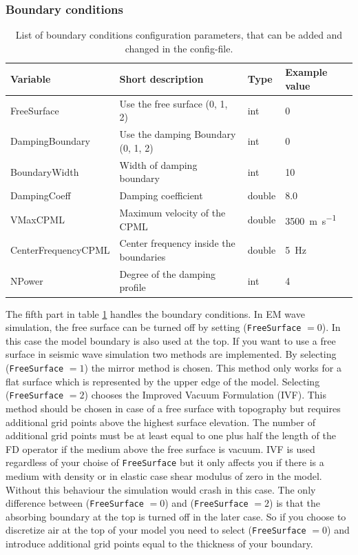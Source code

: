 \documentclass[pdftex,a4paper,parskip,listof=totoc,bibliography=totoc,onehalfspacing,12pt]{scrreprt}
\begin{document}
\subsubsection{Boundary conditions}
\begin{table}[h!]
\caption[List of boundary conditions configuration parameters.]{List of boundary conditions configuration parameters, that can be added and changed in the config-file.}\label{tab:config_boundary}
\centering
\begin{adjustbox}{width=1\textwidth,center=\textwidth}
	\begin{tabular}{llll}
	\toprule
	Variable & Short description & Type & Example value \\
	\midrule
	FreeSurface& Use the free surface (0, 1, 2) & int & \num{0}\\
	DampingBoundary& Use the damping Boundary (0, 1, 2) & int & \num{0}\\
	BoundaryWidth& Width of damping boundary & int & \num{10}\\
	DampingCoeff& Damping coefficient & double & \num{8.0}\\
	VMaxCPML& Maximum velocity of the CPML & double &\SI{3500}{m\per s}\\
	CenterFrequencyCPML\;\;\;\;& Center frequency inside the boundaries\;\;\;  & double &\SI{5}{Hz}\\
	NPower& Degree of the damping profile & int &\num{4}\\
	\bottomrule
	\end{tabular}
	\end{adjustbox}
\end{table}
The fifth part in table \ref{tab:config_boundary} handles the boundary conditions. In EM wave simulation, the free surface can be turned off by setting (\verb+FreeSurface+ $=0$). In this case the model boundary is also used at the top. If you want to use a free surface in seismic wave simulation two methods are implemented. By selecting (\verb+FreeSurface+ $=1$) the mirror method is chosen. This method only works for a flat surface which is represented by the upper edge of the model. Selecting (\verb+FreeSurface+ $=2$) chooses the Improved Vacuum Formulation (IVF). This method should be chosen in case of a free surface with topography but requires additional grid points above the highest surface elevation. The number of additional grid points must be at least equal to one plus half the length of the FD operator if the medium above the free surface is vacuum. IVF is used regardless of your choise of \verb+FreeSurface+ but it only affects you if there is a medium with density or in elastic case shear modulus of zero in the model. Without this behaviour the simulation would crash in this case. The only difference between (\verb+FreeSurface+ $=0$) and (\verb+FreeSurface+ $=2$) is that the absorbing boundary at the top is turned off in the later case. So if you choose to discretize air at the top of your model you need to select (\verb+FreeSurface+ $=0$) and introduce additional grid points equal to the thickness of your boundary. 
\end{document}
